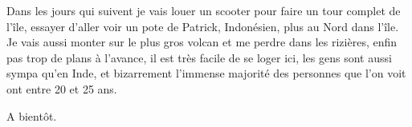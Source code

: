 \begin{multicols}{2}
Dans les jours qui suivent je vais louer un scooter pour faire un tour complet de l'île, essayer d'aller voir un pote de Patrick, Indonésien, plus au Nord dans l'île. Je vais aussi monter sur le plus gros volcan et me perdre dans les rizières, enfin pas trop de plans à l'avance, il est très facile de se loger ici, les gens sont aussi sympa qu'en Inde, et bizarrement l'immense majorité des personnes que l'on voit ont entre 20 et 25 ans.

A bientôt.

\end{multicols}


